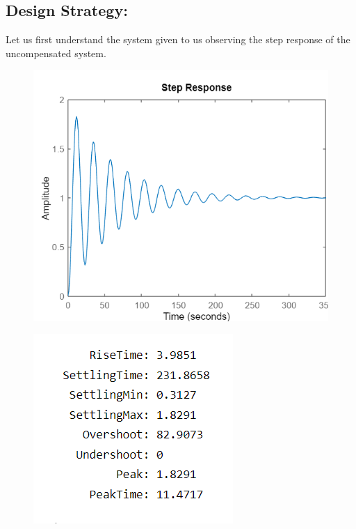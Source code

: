 \documentclass[12pt]{article}
\begin{document}
\subsection*{Design Strategy:}
Let us first understand the system given to us observing the step response of the uncompensated system. \par

\begin{minipage}{0.45\linewidth}
  \begin{figure}[H]
    \centering
    \includegraphics[width=\linewidth]{images/plot1.png}
    \label{fig:plot_1}
  \end{figure}
\end{minipage}%
\hfill
\begin{minipage}{0.45\linewidth}
  \begin{figure}[H]
    \centering
    \includegraphics[width=\linewidth]{images/plot2.png}
    \label{fig:plot_2}
  \end{figure}
\end{minipage}
\end{document}
